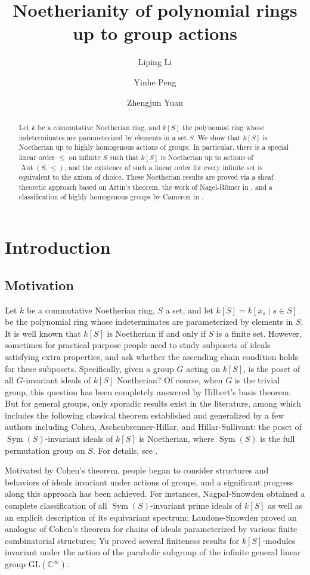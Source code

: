 \documentclass[11pt, reqno]{amsart}
\title{Noetherianity of polynomial rings up to group actions}
\author{Liping Li}
\author{Yinhe Peng}
\author{Zhengjun Yuan}
\theoremstyle{plain}
\numberwithin{equation}{section}
\theoremstyle{definition}
\DeclareMathOperator{\Aut}{Aut}
\DeclareMathOperator{\Sym}{Sym}
\begin{document}
\begin{abstract}
Let $k$ be a commutative Noetherian ring, and $k[S]$ the polynomial ring whose indeterminates are parameterized by elements in a set $S$. We show that $k[S]$ is Noetherian up to highly homogenous actions of groups. In particular, there is a special linear order $\leqslant$ on infinite $S$ such that $k[S]$ is Noetherian up to actions of $\Aut(S, \leqslant)$, and the existence of such a linear order for every infinite set is equivalent to the axiom of choice. These Noetherian results are proved via a sheaf theoretic approach based on Artin's theorem, the work of Nagel-R\"{o}mer in \cite{NR1}, and a classification of highly homogenous groups by Cameron in \cite{Ca76} .
\end{abstract}

\maketitle


\section{Introduction}

\subsection{Motivation}

Let $k$ be a commutative Noetherian ring, $S$ a set, and let $k[S] = k[x_s \mid s \in S]$ be the polynomial ring whose indeterminates are parameterized by elements in $S$. It is well known that $k[S]$ is Noetherian if and only if $S$ is a finite set. However, sometimes for practical purpose people need to study subposets of ideals satisfying extra properties, and ask whether the ascending chain condition holds for these subposets. Specifically, given a group $G$ acting on $k[S]$, is the poset of all $G$-invariant ideals of $k[S]$ Noetherian? Of course, when $G$ is the trivial group, this question has been completely answered by Hilbert's basis theorem. But for general groups, only sporadic results exist in the literature, among which includes the following classical theorem established and generalized by a few authors including Cohen, Aschenbrenner-Hillar, and Hillar-Sullivant: the poset of $\Sym(S)$-invariant ideals of $k[S]$ is Noetherian, where $\Sym(S)$ is the full permutation group on $S$. For details, see \cite{AH, Co, Dr, HS}.

Motivated by Cohen's theorem, people began to consider structures and behaviors of ideals invariant under actions of groups, and a significant progress along this approach has been achieved. For instances, Nagpal-Snowden \cite{NS} obtained a complete classification of all $\Sym(S)$-invariant prime ideals of $k[S]$ as well as an explicit description of its equivariant spectrum; Laudone-Snowden \cite{LS} proved an analogue of Cohen's theorem for chains of ideals parameterized by various finite combinatorial structures; Yu \cite{Y} proved several finiteness results for $k[S]$-modules invariant under the action of the parabolic subgroup of the infinite general linear group $\mathrm{GL} (\mathbb{C}^{\infty})$.
\end{document}
